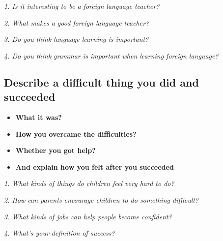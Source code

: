 \documentclass[conference]{IEEEtran}
\begin{document}
\textit{1. Is it interesting to be a foreign language teacher?}

\textit{2. What makes a good foreign language teacher?}

\textit{3. Do you think language learning is important?}

\textit{4. Do you think grammar is important when learning foreign language?}

\subsection{Describe a difficult thing you did and succeeded}
\begin{itemize}
    \item \textbf{What it was?}
    \item \textbf{How you overcame the difficulties?}
    \item \textbf{Whether you got help?}
    \item \textbf{And explain how you felt after you succeeded}
\end{itemize}

\textit{1. What kinds of things do children feel very hard to do?}

\textit{2. How can parents encourage children to do something difficult?}

\textit{3. What kinds of jobs can help people become confident?}

\textit{4. What's your definition of success?}
\end{document}
